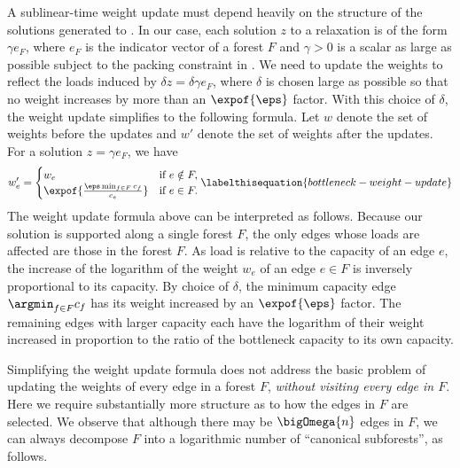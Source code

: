 \documentclass[11pt]{article}
\numberwithin{equation}{section}
\theoremstyle{definition}
\theoremstyle{plain}
\newcommand{\costof}[1]{c_{#1}}
\newcommand{\capacityof}{\costof}%
\newcommand{\weight}[1]{w_{#1}}
\newcommand{\weightv}{w}%
\begin{document}
A %
sublinear-time  %
weight update must depend heavily on the structure of
the solutions generated to . In our case, each
solution $z$ to a relaxation  is of the form
$\gamma e_F$, where $e_F$ is the indicator vector of a forest $F$ and
$\gamma > 0$ is a scalar as large as possible subject to the packing
constraint in . We need to update the weights
to reflect the loads induced by $\delta z = \delta \gamma e_F$, where
$\delta$ is chosen large as possible so that no weight increases by
more than an
%
$\expof{\eps}$ factor.   %
With this choice of
$\delta$, the weight update simplifies to the following formula. Let
$\weightv$ denote the set of weights before the updates and $\weightv'$
denote the set of weights after the updates. For a solution
$z = \gamma e_F$, we have
\begin{align*}
  \weight{e}' =                 %
  \begin{cases}
    \weight{e} &\text{if } e \notin F, \\
    \expof{ %
      \frac{\eps \min_{f \in F} \capacityof{f}}{\capacityof{e}} %
    }%
    &\text{if } e \in F.
  \end{cases}
      \labelthisequation{bottleneck-weight-update} %
\end{align*}
The weight update formula above can be interpreted as follows.
Because our solution is supported along a single forest $F$, the only
edges whose loads are affected are those in the forest $F$. As load is
relative to the capacity of an edge $e$, the increase of the logarithm
of the weight $\weight{e}$ of an edge $e \in F$ is inversely
proportional to its capacity. By choice of $\delta$, the minimum
capacity edge $\argmin_{f \in F} \capacityof{f}$ has its weight
increased by an
%
$\expof{\eps}$ factor.  %
The remaining
edges with larger capacity each have the logarithm of their weight
increased in proportion to the ratio of the bottleneck capacity to its
own capacity.

Simplifying the weight update formula does not address the basic
problem of updating the weights of every edge in a forest $F$,
\emph{without visiting every edge in $F$}. Here we require
substantially more structure as to how the edges in $F$ are
selected. We observe that although there may be $\bigOmega{n}$ edges
in $F$, we can always decompose $F$ into a logarithmic number of
``canonical subforests'', as follows.
\end{document}
